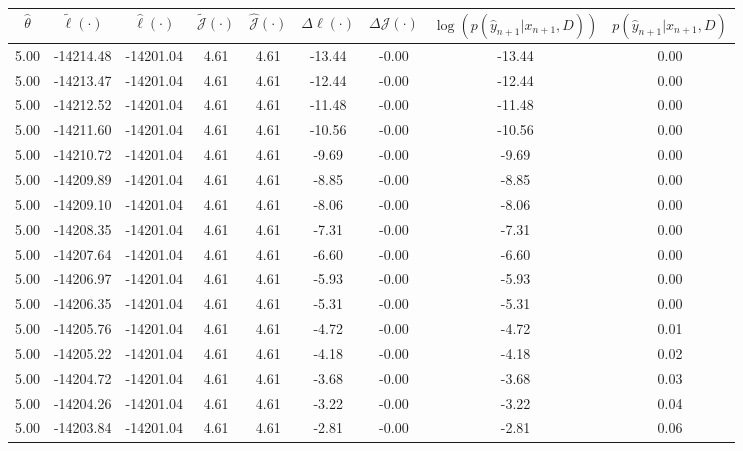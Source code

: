 \begin{table}[htbp]
        \centering
        \tiny
        \begin{adjustbox}{angle=90}
            \begin{tabular}{|c|c|c|c|c|c|c|c|c|}
                \hline
                 $\hat{\theta}$ & $\tilde{\ell}(\cdot)$ & $\hat{\ell}(\cdot)$ & $\tilde{\mathcal{J}}(\cdot)$ & $\hat{\mathcal{J}}(\cdot)$ & $\Delta \ell(\cdot)$ & $\Delta \mathcal{J}(\cdot)$ & $\log(p(\hat{y}_{n+1}|x_{n+1}, D))$ & $p(\hat{y}_{n+1}|x_{n+1}, D)$ \\
                \hline
                 5.00 & -14214.48 & -14201.04 & 4.61 & 4.61 & -13.44 & -0.00 & -13.44 & 0.00\\ \hline
 5.00 & -14213.47 & -14201.04 & 4.61 & 4.61 & -12.44 & -0.00 & -12.44 & 0.00\\ \hline
 5.00 & -14212.52 & -14201.04 & 4.61 & 4.61 & -11.48 & -0.00 & -11.48 & 0.00\\ \hline
 5.00 & -14211.60 & -14201.04 & 4.61 & 4.61 & -10.56 & -0.00 & -10.56 & 0.00\\ \hline
 5.00 & -14210.72 & -14201.04 & 4.61 & 4.61 & -9.69 & -0.00 & -9.69 & 0.00\\ \hline
 5.00 & -14209.89 & -14201.04 & 4.61 & 4.61 & -8.85 & -0.00 & -8.85 & 0.00\\ \hline
 5.00 & -14209.10 & -14201.04 & 4.61 & 4.61 & -8.06 & -0.00 & -8.06 & 0.00\\ \hline
 5.00 & -14208.35 & -14201.04 & 4.61 & 4.61 & -7.31 & -0.00 & -7.31 & 0.00\\ \hline
 5.00 & -14207.64 & -14201.04 & 4.61 & 4.61 & -6.60 & -0.00 & -6.60 & 0.00\\ \hline
 5.00 & -14206.97 & -14201.04 & 4.61 & 4.61 & -5.93 & -0.00 & -5.93 & 0.00\\ \hline
 5.00 & -14206.35 & -14201.04 & 4.61 & 4.61 & -5.31 & -0.00 & -5.31 & 0.00\\ \hline
 5.00 & -14205.76 & -14201.04 & 4.61 & 4.61 & -4.72 & -0.00 & -4.72 & 0.01\\ \hline
 5.00 & -14205.22 & -14201.04 & 4.61 & 4.61 & -4.18 & -0.00 & -4.18 & 0.02\\ \hline
 5.00 & -14204.72 & -14201.04 & 4.61 & 4.61 & -3.68 & -0.00 & -3.68 & 0.03\\ \hline
 5.00 & -14204.26 & -14201.04 & 4.61 & 4.61 & -3.22 & -0.00 & -3.22 & 0.04\\ \hline
 5.00 & -14203.84 & -14201.04 & 4.61 & 4.61 & -2.81 & -0.00 & -2.81 & 0.06\\ \hline

\end{tabular}
\end{adjustbox}
\end{table}
